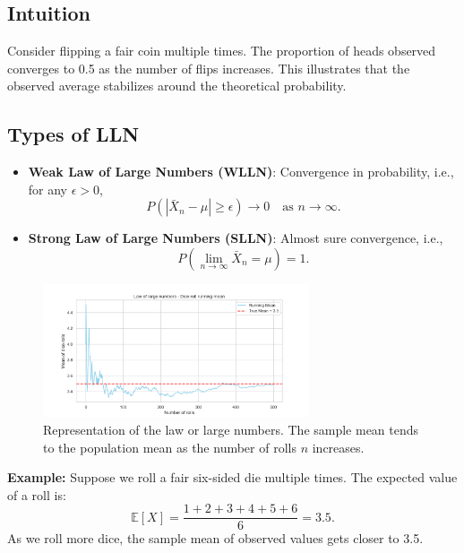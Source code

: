 \documentclass{book}
\begin{document}
\subsection{Intuition}
Consider flipping a fair coin multiple times. The proportion of heads observed converges to 0.5 as the number of flips increases. This illustrates that the observed average stabilizes around the theoretical probability.

\subsection{Types of LLN}
\begin{itemize}
    \item \textbf{Weak Law of Large Numbers (WLLN)}: Convergence in probability, i.e., for any $\epsilon > 0$, 
    \begin{equation}
        P(|\bar{X}_n - \mu| \geq \epsilon) \to 0 \quad \text{as } n \to \infty.
    \end{equation}
    \item \textbf{Strong Law of Large Numbers (SLLN)}: Almost sure convergence, i.e.,
    \begin{equation}
        P\left( \lim_{n \to \infty} \bar{X}_n = \mu \right) = 1.
    \end{equation}
\end{itemize}

\begin{figure}[ht]
    \centering
    \includegraphics[width=0.7\textwidth]{figures/chapter3/law_large_numbers.png}
    \caption{Representation of the law or large numbers. The sample mean tends to the population mean as the number of rolls $n$ increases.}
    \label{fig:random}
\end{figure}

\textbf{Example:} Suppose we roll a fair six-sided die multiple times. The expected value of a roll is:
\begin{equation}
    \mathbb{E}[X] = \frac{1+2+3+4+5+6}{6} = 3.5.
\end{equation}
As we roll more dice, the sample mean of observed values gets closer to 3.5.
\end{document}

